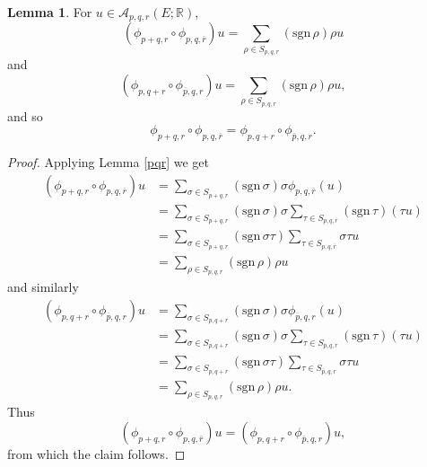 \documentclass{article}
\newcommand{\sgn}{\mathrm{sgn}\,}
\theoremstyle{definition}
\newtheorem{lemma}[theorem]{Lemma}
\theoremstyle{definition}
\begin{document}
\begin{lemma}
For $u \in \mathscr{A}_{p,q,r}(E;\mathbb{R})$,
\[
(\phi_{p+q,r} \circ \phi_{p,q,\overline{r}})u = \sum_{\rho \in S_{p,q,r}} (\sgn \rho) \rho u
\]
and
\[
(\phi_{p,q+r} \circ \phi_{\overline{p},q,r})u = \sum_{\rho \in S_{p,q,r}} (\sgn \rho) \rho u,
\]
and so
\[
\phi_{p+q,r} \circ \phi_{p,q,\overline{r}} = \phi_{p,q+r} \circ \phi_{\overline{p},q,r}.
\]
\label{associative}
\end{lemma}
\begin{proof}
Applying Lemma \ref{pqr} we get
\begin{align*}
(\phi_{p+q,r} \circ \phi_{p,q,\overline{r}})u&=\sum_{\sigma \in S_{p+q,r}} (\sgn \sigma) \sigma \phi_{p,q,\overline{r}}(u)\\
&=\sum_{\sigma \in S_{p+q,r}} (\sgn \sigma) \sigma \sum_{\tau \in S_{p,q,\overline{r}}} (\sgn \tau)(\tau u)\\
&=\sum_{\sigma \in S_{p+q,r}} (\sgn \sigma \tau) \sum_{\tau \in S_{p,q,\overline{r}}} \sigma \tau u\\
&=\sum_{\rho \in S_{p,q,r}} (\sgn \rho) \rho u
\end{align*}
and similarly
\begin{align*}
(\phi_{p,q+r} \circ \phi_{\overline{p},q,r})u&=\sum_{\sigma \in S_{p,q+r}} (\sgn \sigma) \sigma \phi_{\overline{p},q,r}(u)\\
&=\sum_{\sigma \in S_{p,q+r}} (\sgn \sigma) \sigma \sum_{\tau \in S_{\overline{p},q,r}} (\sgn \tau)(\tau u)\\
&=\sum_{\sigma \in S_{p,q+r}} (\sgn \sigma \tau) \sum_{\tau \in S_{\overline{p},q,r}} \sigma \tau u\\
&=\sum_{\rho \in S_{p,q,r}} (\sgn \rho) \rho u.
\end{align*}
Thus
\[
(\phi_{p+q,r} \circ \phi_{p,q,\overline{r}})u=(\phi_{p,q+r} \circ \phi_{\overline{p},q,r})u,
\]
from which the claim follows.
\end{proof}
\end{document}
